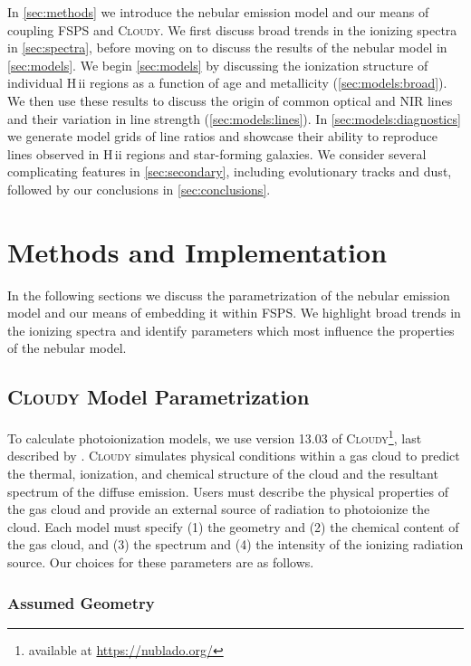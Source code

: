 \documentclass[twocolumn, tighten]{aastex61}
\newcommand{\Sec}[1]{\autoref{sec:#1}}
\newcommand{\FSPS}{{\sc FSPS}\xspace}
\newcommand{\Cloudy}{\textsc{Cloudy}\xspace}
\newcommand{\hii}{H\,{\sc ii}\xspace}
\begin{document}
In \Sec{methods} we introduce the nebular emission model and our means of coupling \FSPS and \Cloudy. We first discuss broad trends in the ionizing spectra in \Sec{spectra}, before moving on to discuss the results of the nebular model in \Sec{models}. We begin \Sec{models} by discussing the ionization structure of individual \hii regions as a function of age and metallicity (\Sec{models:broad}). We then use these results to discuss the origin of common optical and NIR lines and their variation in line strength (\Sec{models:lines}). In \Sec{models:diagnostics} we generate model grids of line ratios and showcase their ability to reproduce lines observed in \hii regions and star-forming galaxies. We consider several complicating features in \Sec{secondary}, including evolutionary tracks and dust, followed by our conclusions in \Sec{conclusions}.

\section{Methods and Implementation}\label{sec:methods}

In the following sections we discuss the parametrization of the nebular emission model and our means of embedding it within \FSPS. We highlight broad trends in the ionizing spectra and identify parameters which most influence the properties of the nebular model.

\subsection{\Cloudy Model Parametrization}\label{sec:methods:cloudy}

To calculate photoionization models, we use version 13.03 of \Cloudy\footnote{available at \url{https://nublado.org/}}, last described by \citet{Ferland13}. \Cloudy simulates physical conditions within a gas cloud to predict the thermal, ionization, and chemical structure of the cloud and the resultant spectrum of the diffuse emission. Users must describe the physical properties of the gas cloud and provide an external source of radiation to photoionize the cloud. Each model must specify (1) the geometry and (2) the chemical content of the gas cloud, and (3) the spectrum and (4) the intensity of the ionizing radiation source. Our choices for these parameters are as follows.

\subsubsection{Assumed Geometry}\label{sec:methods:cloudy:geom}
\end{document}
